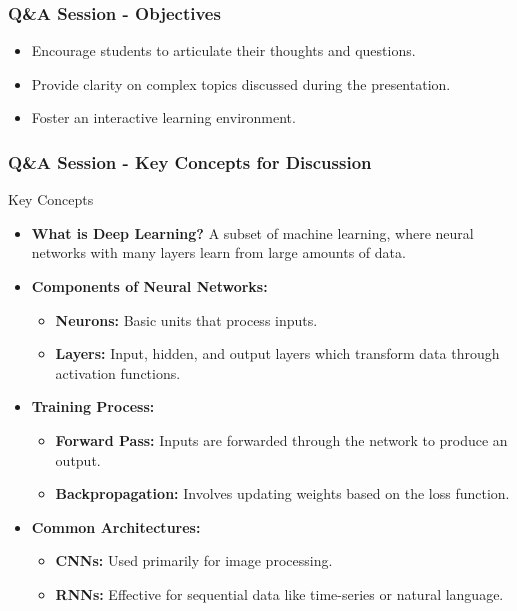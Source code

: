 \documentclass[aspectratio=169]{beamer}
\begin{document}
\begin{frame}[fragile]
    \frametitle{Q\&A Session - Objectives}
    \begin{itemize}
        \item Encourage students to articulate their thoughts and questions.
        \item Provide clarity on complex topics discussed during the presentation.
        \item Foster an interactive learning environment.
    \end{itemize}
\end{frame}

\begin{frame}[fragile]
    \frametitle{Q\&A Session - Key Concepts for Discussion}
    \begin{block}{Key Concepts}
        \begin{itemize}
            \item \textbf{What is Deep Learning?} A subset of machine learning, where neural networks with many layers learn from large amounts of data.
            \item \textbf{Components of Neural Networks:}
                \begin{itemize}
                    \item \textbf{Neurons:} Basic units that process inputs.
                    \item \textbf{Layers:} Input, hidden, and output layers which transform data through activation functions.
                \end{itemize}
            \item \textbf{Training Process:}
                \begin{itemize}
                    \item \textbf{Forward Pass:} Inputs are forwarded through the network to produce an output.
                    \item \textbf{Backpropagation:} Involves updating weights based on the loss function.
                \end{itemize}
            \item \textbf{Common Architectures:}
                \begin{itemize}
                    \item \textbf{CNNs:} Used primarily for image processing.
                    \item \textbf{RNNs:} Effective for sequential data like time-series or natural language.
                \end{itemize}
        \end{itemize}
    \end{block}
\end{frame}
\end{document}
